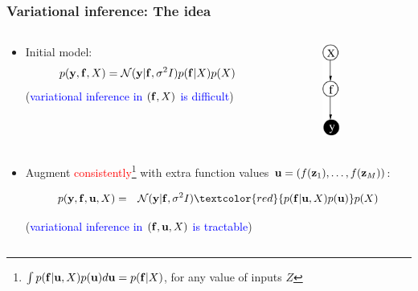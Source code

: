 \documentclass{beamer}
\begin{document}
\frame
{

\frametitle{Variational inference: The idea} 

\begin{columns}
\begin{column}[t]{8cm}

\begin{itemize}
\item Initial model:
$$
p(\mathbf{y},\mathbf{f},X) = \mathcal{N}(\mathbf{y}|\mathbf{f},\sigma^2
  I) p(\mathbf{f}|X) p(X) 
$$
(\textcolor{blue}{variational inference in $(\mathbf{f},X)$ is difficult})

\end{itemize}
\end{column}

\begin{column}[t]{3cm}
\begin{figure}
\includegraphics[width=8mm,height=30mm]{../../../vargplvm/tex/diagrams/net}
\end{figure}
\end{column}
\end{columns}

\begin{columns}
\begin{column}[t]{8cm}
\begin{itemize}

\item Augment \textcolor{red}{consistently}\footnote{$\int
    p(\mathbf{f}|\mathbf{u}, X) p(\mathbf{u}) d \mathbf{u} =
    p(\mathbf{f}|X)$, for any value of inputs $Z$}
 with extra function values $\mathbf{u} = (f(\mathbf{z}_1),\ldots,f(\mathbf{z}_M))$:

\begin{eqnarray}
p(\bfy,\bff,\bfu, X) 
& = & \mathcal{N}(\bfy|\bff,\sigma^2I)
\textcolor{red}{p(\bff | \bfu, X) p(\bfu)} p(X) \nonumber
\end{eqnarray}

(\textcolor{blue}{variational inference in $(\mathbf{f}, \mathbf{u}, X)$ is tractable})


\end{itemize}
\end{column}
\end{columns}}
\end{document}
